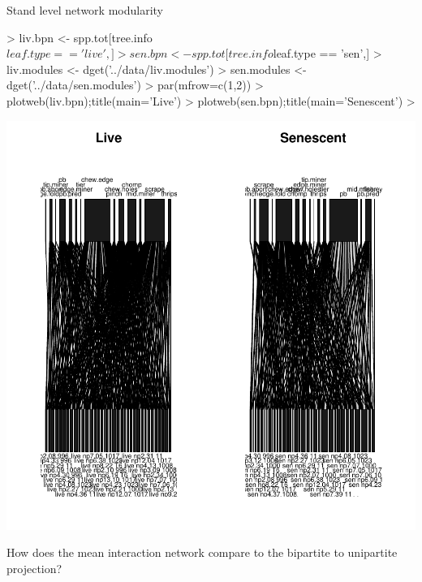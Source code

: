 \documentclass[12pt]{article}
\begin{document}
Stand level network modularity

\begin{Schunk}
\begin{Sinput}
> liv.bpn <- spp.tot[tree.info$leaf.type == 'live',]
> sen.bpn <- spp.tot[tree.info$leaf.type == 'sen',]
> liv.modules <- dget('../data/liv.modules')
> sen.modules <- dget('../data/sen.modules')
> par(mfrow=c(1,2))
> plotweb(liv.bpn);title(main='Live')
> plotweb(sen.bpn);title(main='Senescent')
> 
\end{Sinput}
\end{Schunk}
\includegraphics{notebook-009}

How does the mean interaction network compare to the bipartite to
unipartite projection?
\end{document}
